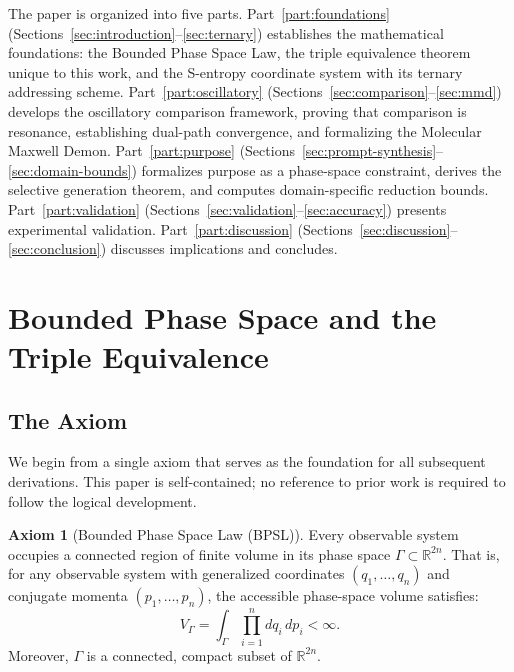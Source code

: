 \documentclass[11pt,twocolumn,a4paper]{article}
\theoremstyle{definition}
\newtheorem{axiom}[theorem]{Axiom}
\theoremstyle{remark}
\newcommand{\Real}{\mathbb{R}}
\begin{document}
The paper is organized into five parts. Part~\ref{part:foundations} (Sections~\ref{sec:introduction}--\ref{sec:ternary}) establishes the mathematical foundations: the Bounded Phase Space Law, the triple equivalence theorem unique to this work, and the S-entropy coordinate system with its ternary addressing scheme. Part~\ref{part:oscillatory} (Sections~\ref{sec:comparison}--\ref{sec:mmd}) develops the oscillatory comparison framework, proving that comparison is resonance, establishing dual-path convergence, and formalizing the Molecular Maxwell Demon. Part~\ref{part:purpose} (Sections~\ref{sec:prompt-synthesis}--\ref{sec:domain-bounds}) formalizes purpose as a phase-space constraint, derives the selective generation theorem, and computes domain-specific reduction bounds. Part~\ref{part:validation} (Sections~\ref{sec:validation}--\ref{sec:accuracy}) presents experimental validation. Part~\ref{part:discussion} (Sections~\ref{sec:discussion}--\ref{sec:conclusion}) discusses implications and concludes.

\section{Bounded Phase Space and the Triple Equivalence}\label{sec:bpsl}

\subsection{The Axiom}\label{sec:axiom}

We begin from a single axiom that serves as the foundation for all subsequent derivations. This paper is self-contained; no reference to prior work is required to follow the logical development.

\begin{axiom}[Bounded Phase Space Law (BPSL)]\label{axiom:bpsl}
Every observable system occupies a connected region of finite volume in its phase space $\Gamma \subset \Real^{2n}$. That is, for any observable system with generalized coordinates $(q_1, \ldots, q_n)$ and conjugate momenta $(p_1, \ldots, p_n)$, the accessible phase-space volume satisfies:
\begin{equation}\label{eq:bpsl}
  V_\Gamma = \int_\Gamma \prod_{i=1}^{n} dq_i\, dp_i < \infty.
\end{equation}
Moreover, $\Gamma$ is a connected, compact subset of $\Real^{2n}$.
\end{axiom}
\end{document}
